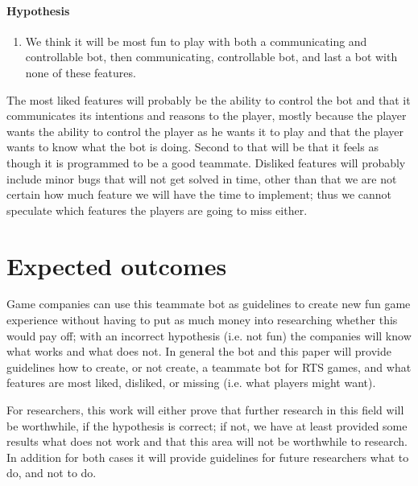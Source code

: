 \paragraph{Hypothesis}
\begin{enumerate}
	\item We think it will be most fun to play with both a communicating and controllable bot, then
		communicating, controllable bot, and last a bot with none of these features.
\end{enumerate}

The most liked features will probably be the ability to control the bot and that it communicates its
intentions and reasons to the player, mostly because the player wants the ability to control the
player as he wants it to play and that the player wants to know what the bot is doing. Second to
that will be that it feels as though it is programmed to be a good teammate. Disliked features will
probably include minor bugs that will not get solved in time, other than that we are not certain how
much feature we will have the time to implement; thus we cannot speculate which features the players
are going to miss either.

\section{Expected outcomes}
Game companies can use this teammate bot as guidelines to create new fun game experience without having
to put as much money into researching whether this would pay off; with an incorrect hypothesis (i.e.
not fun) the companies will know what works and what does not. In general the bot and this paper will
provide guidelines how to create, or not create, a teammate bot for RTS games, and what features are
most liked, disliked, or missing (i.e. what players might want).

For researchers, this work will either prove that further research in this field will be worthwhile,
if the hypothesis is correct; if not, we have at least provided some results what does not work and
that this area will not be worthwhile to research. In addition for both cases it will provide
guidelines for future researchers what to do, and not to do.

